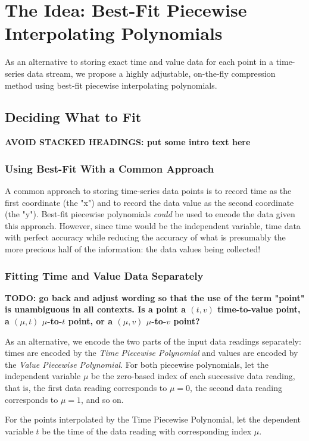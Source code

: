 \documentclass{article}
\begin{document}
\section{The Idea: Best-Fit Piecewise Interpolating Polynomials}
\label{sec:the_idea}
As an alternative to storing exact time and value data for each point in a time-series data stream, we propose a highly adjustable, on-the-fly compression method using best-fit piecewise interpolating polynomials.

\subsection{Deciding What to Fit}
\textbf{AVOID STACKED HEADINGS: put some intro text here}
\subsubsection{Using Best-Fit With a Common Approach}
A common approach to storing time-series data points is to record time as the first coordinate (the "x") and to record the data value as the second coordinate (the "y"). Best-fit piecewise polynomials \textit{could} be used to encode the data given this approach. However, since time would be the independent variable, time data with perfect accuracy while reducing the accuracy of what is presumably the more precious half of the information: the data values being collected!

\subsubsection{Fitting Time and Value Data Separately}
\textbf{TODO: go back and adjust wording so that the use of the term "point" is unambiguous in all contexts. Is a point a \((t,v)\) time-to-value point, a \((\mu,t)\) $\mu$-to-\(t\) point, or a \((\mu,v)\) $\mu$-to-\(v\) point?}

As an alternative, we encode the two parts of the input data readings separately: times are encoded by the \textit{Time Piecewise Polynomial} and values are encoded by the \textit{Value Piecewise Polynomial}. For both piecewise polynomials, let the independent variable $\mu$ be the zero-based index of each successive data reading, that is, the first data reading corresponds to $\mu = 0$, the second data reading corresponds to $\mu = 1$, and so on.

For the points interpolated by the Time Piecewise Polynomial, let the dependent variable \(t\) be the time of the data reading with corresponding index $\mu$.
\end{document}
